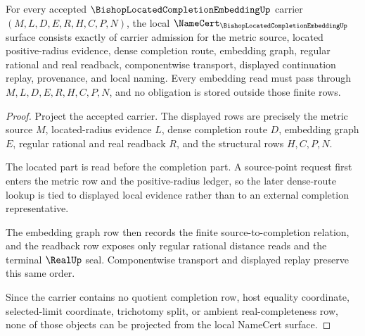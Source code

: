 \begin{theorem}
\label{thm:bishop-located-completion-embedding-namecert-obligations}
For every accepted $\BishopLocatedCompletionEmbeddingUp$ carrier $(M,L,D,E,R,H,C,P,N)$, the local $\NameCert_{\BishopLocatedCompletionEmbeddingUp}$ surface consists exactly of carrier admission for the metric source, located positive-radius evidence, dense completion route, embedding graph, regular rational and real readback, componentwise transport, displayed continuation replay, provenance, and local naming. Every embedding read must pass through $M,L,D,E,R,H,C,P,N$, and no obligation is stored outside those finite rows.
\end{theorem}
\begin{proof}
Project the accepted carrier. The displayed rows are precisely the metric source $M$, located-radius evidence $L$, dense completion route $D$, embedding graph $E$, regular rational and real readback $R$, and the structural rows $H,C,P,N$.

The located part is read before the completion part. A source-point request first enters the metric row and the positive-radius ledger, so the later dense-route lookup is tied to displayed local evidence rather than to an external completion representative.

The embedding graph row then records the finite source-to-completion relation, and the readback row exposes only regular rational distance reads and the terminal $\RealUp$ seal. Componentwise transport and displayed replay preserve this same order.

Since the carrier contains no quotient completion row, host equality coordinate, selected-limit coordinate, trichotomy split, or ambient real-completeness row, none of those objects can be projected from the local NameCert surface.
\end{proof}


